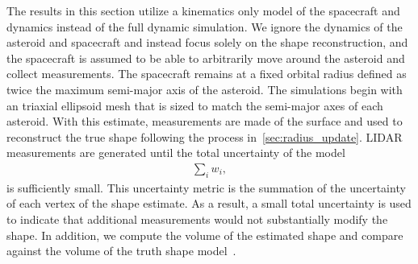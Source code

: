 \documentclass[journal]{new-aiaa}
\begin{document}
The results in this section utilize a kinematics only model of the spacecraft and dynamics instead of the full dynamic simulation. 
We ignore the dynamics of the asteroid and spacecraft and instead focus solely on the shape reconstruction, and the spacecraft is assumed to be able to arbitrarily move around the asteroid and collect measurements.
The spacecraft remains at a fixed orbital radius defined as twice the maximum semi-major axis of the asteroid.
The simulations begin with an triaxial ellipsoid mesh that is sized to match the semi-major axes of each asteroid.
With this estimate, measurements are made of the surface and used to reconstruct the true shape following the process in~\cref{sec:radius_update}.
LIDAR measurements are generated until the total uncertainty of the model
\begin{align*}
    \sum_i w_i,
\end{align*}
is sufficiently small.
This uncertainty metric is the summation of the uncertainty of each vertex of the shape estimate.
As a result, a small total uncertainty is used to indicate that additional measurements would not substantially modify the shape.
In addition, we compute the volume of the estimated shape and compare against the volume of the truth shape model~\cite{neese2004}.
\end{document}
